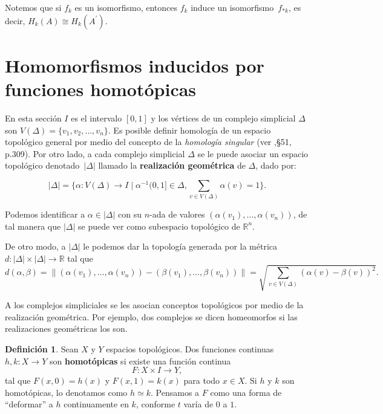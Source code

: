 \documentclass[12pt]{book}
\theoremstyle{definition}
\newtheorem{definition}[theorem]{Definición}
\newcounter{in}
\newcounter{ini}
\begin{document}
Notemos que si $f_{k}$ es un isomorfismo, entonces $f_{k}$ induce un
isomorfismo~$f_{*k}$, es decir, $H_{k}(A)\cong H_{k}(A^{'})$.

\section[Homomorfismos inducidos]{Homomorfismos inducidos por funciones homotópicas}
\label{hom-ind}

En esta sección $I$ es el intervalo $[0,1]$ y los vértices de un
complejo simplicial $\Delta$ son
$V(\Delta)=\{v_{1},v_{2},\dots,v_{n}\}$. Es posible definir homología
de un espacio topológico general por medio del concepto de la
\emph{homología singular} (ver \cite{munkres1984elements},\S 51,
p.309). Por otro lado, a cada complejo simplicial $\Delta$ se le
puede asociar un espacio topológico denotado~$|\Delta|$ llamado la
\textbf{realización geométrica} de $\Delta$, dado por:

$$|\Delta|=\{\alpha:V(\Delta)\rightarrow I\mid\alpha^{-1}(0,1]\in
\Delta, \sum _{v\in V(\Delta)}\alpha(v)=1\}.$$

Podemos identificar a $\alpha\in |\Delta|$ con su $n$-ada de valores
$(\alpha(v_{1}),\dots,\alpha(v_{n}))$, de tal manera que $|\Delta|$ se
puede ver como subespacio topológico de $\mathbb{R}^{n}$.

De otro modo, a $|\Delta|$ le podemos dar la topología generada por la
métrica $d:|\Delta|\times |\Delta|\rightarrow\mathbb{R}$ tal que
\begin{equation*}
  \label{metrica}
  d(\alpha,\beta)=\parallel
  (\alpha(v_{1}),\dots,\alpha(v_{n}))-(\beta(v_{1}),\dots,\beta(v_{n}))\parallel=\sqrt{\sum
    _{v\in V(\Delta)}(\alpha(v)-\beta(v))^{2}}.
\end{equation*}

A los complejos simpliciales se les asocian conceptos topológicos por
medio de la realización geométrica. Por ejemplo, dos complejos se
dicen homeomorfos si las realizaciones geométricas los son.
\begin{definition}
  Sean $X$ y $Y$ espacios topológicos. Dos funciones continuas
  $h,k:X\rightarrow Y$ son \textbf{homotópicas} si existe una función continua
  $$F:X\times I\rightarrow Y,$$
  tal que $F(x,0)=h(x)$ y $F(x,1)=k(x)$ para todo $x\in X.$ Si $h$ y
  $k$ son homotópicas, lo denotamos como $h\simeq k$. Pensamos a $F$
  como una forma de ``deformar'' a $h$ continuamente en $k$, conforme
  $t$ varía de $0$ a $1$.
\end{definition}
\end{document}
